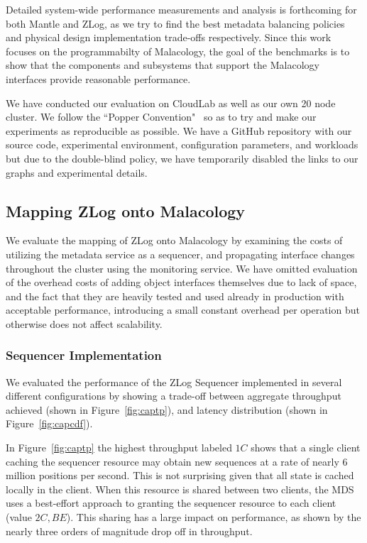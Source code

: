\documentclass[preprint]{sigplanconf-eurosys}
\begin{document}
Detailed system-wide performance measurements and analysis is forthcoming for
both Mantle and ZLog, as we try to find the best metadata balancing policies
and physical design implementation trade-offs respectively.  Since this work
focuses on the programmabilty of Malacology, the goal of the benchmarks is to
show that the components and subsystems that support the Malacology interfaces
provide reasonable performance.  

We have conducted our evaluation on CloudLab as well as our own 20 node
cluster. We follow the ``Popper Convention"~\cite{anonymous} so as to try and
make our experiments as reproducible as possible. We have a GitHub repository
with our source code, experimental environment, configuration parameters, and
workloads but due to the double-blind policy, we have temporarily disabled the
links to our graphs and experimental details.

\subsection{Mapping ZLog onto Malacology}
\label{sec:mapping-zlog-onto-malacology}
We evaluate the mapping of ZLog onto Malacology by examining the costs of
utilizing the metadata service as a sequencer, and propagating interface
changes throughout the cluster using the monitoring service. We have omitted
evaluation of the overhead costs of adding object interfaces themselves due to
lack of space, and the fact that they are heavily tested and used already in
production with acceptable performance, introducing a small constant overhead
per operation but otherwise does not affect scalability.

\subsubsection{Sequencer Implementation}

We evaluated the performance of the ZLog Sequencer implemented in several
different configurations by showing a trade-off between aggregate throughput
achieved (shown in Figure~\ref{fig:captp}), and latency distribution (shown in
Figure~\ref{fig:capcdf}).

In Figure~\ref{fig:captp} the highest throughput labeled $1C$ shows that a
single client caching the sequencer resource may obtain new sequences at a rate
of nearly 6 million positions per second. This is not surprising given that all
state is cached locally in the client. When this resource is shared between two
clients, the MDS uses a best-effort approach to granting the sequencer resource
to each client (value $2C,BE$). This sharing has a large impact on performance,
as shown by the nearly three orders of magnitude drop off in throughput.
\end{document}
